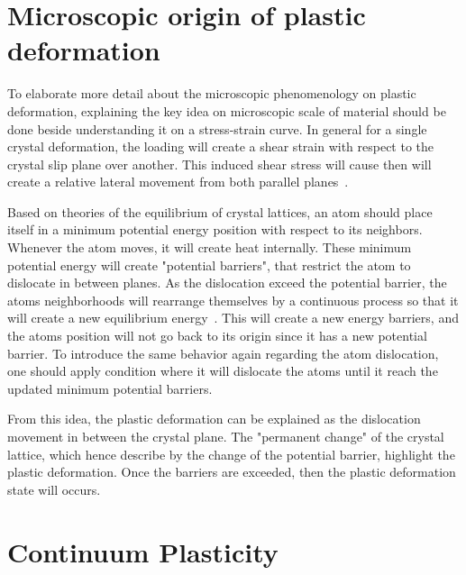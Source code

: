 \documentclass[12pt]{article}
\begin{document}
\section{Microscopic origin of plastic deformation}
\hspace{2em}
To elaborate more detail about the microscopic phenomenology on plastic deformation, explaining the key idea on microscopic 
scale of material should be done beside understanding it on a stress-strain curve. In general for a single crystal deformation, 
the loading will create a shear strain with respect to the crystal slip plane over another. This induced shear stress will cause
then will create a relative lateral movement from both parallel planes~\cite{taylor1934plastic}. 

\hspace{2em}
Based on theories of the equilibrium of crystal lattices, an atom should place itself in a minimum potential energy position
with respect to its neighbors. Whenever the atom moves, it will create heat internally. These minimum potential energy
will create "potential barriers", that restrict the atom to dislocate in between planes. As the dislocation exceed the
potential barrier, the atoms neighborhoods will rearrange themselves by a continuous process so that it will create a 
new equilibrium energy~\cite{taylor1934plastic}. This will create a new energy barriers, and the atoms position will not go back to
its origin since it has a new potential barrier. To introduce the same behavior again regarding the atom dislocation, 
one should apply condition where it will dislocate the atoms until it reach the updated minimum potential barriers.

\hspace{2em}From this idea, the plastic deformation can be explained as the dislocation movement
in between the crystal plane. The "permanent change" of the crystal lattice, which hence describe by the 
change of the potential barrier, highlight the plastic deformation. Once the barriers are exceeded, then
the plastic deformation state will occurs. 
\section*{Continuum Plasticity}
\end{document}
